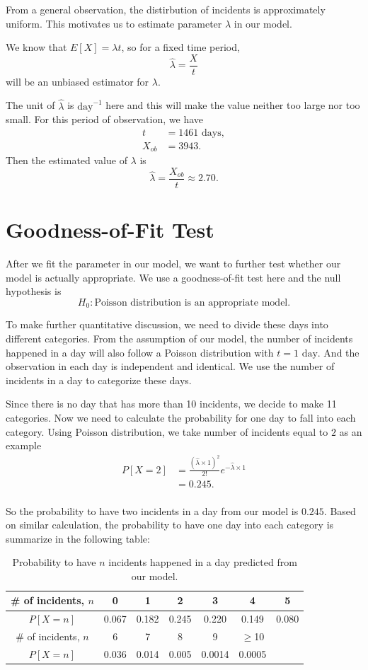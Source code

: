 \documentclass[11pt,a4paper,english]{article}
\begin{document}
From a general observation, the distirbution of incidents is approximately uniform. This motivates us to estimate parameter $\lambda$ in our model.

We know that $E[X] = \lambda t$, so for a fixed time period, 
\[\hat{\lambda} = \frac{X}{t}\]
will be an unbiased estimator for $\lambda$.

The unit of $\hat{\lambda}$ is $\text{day}^{-1}$ here and this will make the value neither too large nor too small. For this period of observation, we have 
\begin{align*}
	t &= 1461\text{ days},\\
	X_{ob} &= 3943.
\end{align*}
Then the estimated value of $\lambda$ is
\[\hat{\lambda} = \frac{X_{ob}}{t} \approx 2.70.\] 

\section{Goodness-of-Fit Test}
After we fit the parameter in our model, we want to further test whether our model is actually appropriate. We use a goodness-of-fit test here and the null hypothesis is
\[H_{0}:\text{Poisson distribution is an appropriate model.}\]

To make further quantitative discussion, we need to divide these days into different categories. 
From the assumption of our model, the number of incidents happened in a day will also follow a Poisson distribution with $t = 1\text{ day}$. 
And the observation in each day is independent and identical. We use the number of incidents in a day to categorize these days.

Since there is no day that has more than 10 incidents, we decide to make 11 categories. Now we need to calculate the probability for one day to fall into each category. Using Poisson distribution, we take number of incidents equal to $2$ as an example
\[
	\begin{aligned}
		P[X = 2] &= \frac{(\hat{\lambda}\times 1)^{2}}{2!}e^{-\hat{\lambda} \times 1}\\
		&= 0.245.\\
	\end{aligned}
\]

So the probability to have two incidents in a day from our model is $0.245$.
Based on similar calculation, the probability to have one day into each category is summarize in the following table:
\begin{table}[htbp]
    \centering
    \caption{Probability to have $n$ incidents happened in a day predicted from our model.}
	\begin{tabular}{c|cccccc}
		\hline
		\# of incidents, $n$ & 0 & 1 & 2 & 3 & 4 & 5\\
		\hline
		$P[X = n]$ & 0.067 & 0.182 & 0.245 & 0.220 & 0.149 & 0.080\\ 
		\hline
		\# of incidents, $n$  & 6 & 7 & 8 & 9 & $\geq$10 & \\
		\hline
		$P[X = n]$  & 0.036 & 0.014 & 0.005 & 0.0014 & 0.0005 & \\ 
		\hline
    \end{tabular}
\end{table}
\end{document}
